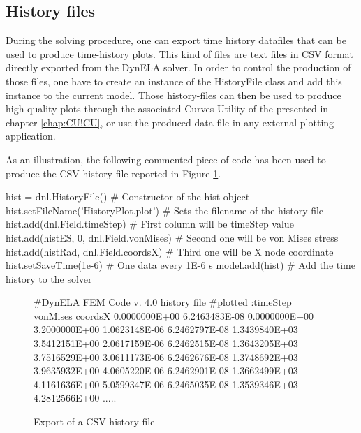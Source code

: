 \subsection{History files}

During the solving procedure, one can export time history datafiles that can be used to produce time-history plots. This kind of files are text files in CSV format directly exported from the DynELA solver. In order to control the production of those files, one have to create an instance of the \textsf{HistoryFile} class and add this instance to the current model. Those history-files can then be used to produce high-quality plots through the associated \textsf{Curves Utility} of the \DynELA presented in chapter \ref{chap:CU!CU}, or use the produced data-file in any external plotting application.

As an illustration, the following commented piece of code has been used to produce the CSV history file reported in Figure \ref{fig:PL!HF!Export}.
\begin{PythonListing}
hist = dnl.HistoryFile()              # Constructor of the hist object
hist.setFileName('HistoryPlot.plot')  # Sets the filename of the history file
hist.add(dnl.Field.timeStep)                 # First column will be timeStep value
hist.add(histES, 0, dnl.Field.vonMises)      # Second one will be von Mises stress
hist.add(histRad, dnl.Field.coordsX) # Third one will be X node coordinate
hist.setSaveTime(1e-6)                       # One data every 1E-6 s
model.add(hist)                              # Add the time history to the solver
\end{PythonListing}

\begin{figure}[h]
\begin{centering}
\begin{BashListing}
#DynELA FEM Code v. 4.0 history file
#plotted :timeStep vonMises coordsX
0.0000000E+00 6.2463483E-08 0.0000000E+00 3.2000000E+00
1.0623148E-06 6.2462797E-08 1.3439840E+03 3.5412151E+00
2.0617159E-06 6.2462515E-08 1.3643205E+03 3.7516529E+00
3.0611173E-06 6.2462676E-08 1.3748692E+03 3.9635932E+00
4.0605220E-06 6.2462901E-08 1.3662499E+03 4.1161636E+00
5.0599347E-06 6.2465035E-08 1.3539346E+03 4.2812566E+00
.....
\end{BashListing}
\par\end{centering}
\caption{Export of a CSV history file\label{fig:PL!HF!Export}}
\end{figure}

